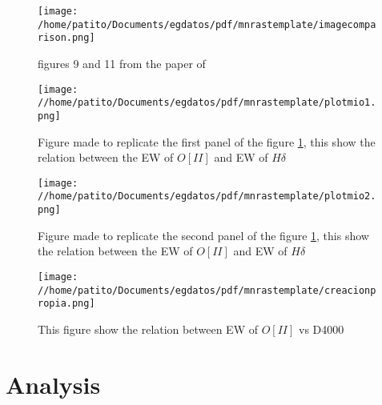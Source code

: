 \documentclass[fleqn,usenatbib]{mnras}
\begin{document}
\begin{figure}
	\texttt{[image: /home/patito/Documents/egdatos/pdf/mnrastemplate/imagecomparison.png]}
    \caption{figures 9 and 11 from the paper of \citet{Balogh}}
    \label{figsbaloghs}
\end{figure}

\begin{figure}
	\texttt{[image: //home/patito/Documents/egdatos/pdf/mnrastemplate/plotmio1.png]}
	\caption{Figure made to replicate the first panel of the figure \ref{figsbaloghs}, this show the relation between the EW of $O[II]$ and EW of $H\delta$}
    \label{plotmio1}
\end{figure}

\begin{figure}
	\texttt{[image: //home/patito/Documents/egdatos/pdf/mnrastemplate/plotmio2.png]}
	\caption{Figure made to replicate the second panel of the figure \ref{figsbaloghs}, this show the relation between the EW of $O[II]$ and EW of $H\delta$}
    \label{plotmio2}
\end{figure}

\begin{figure}
	\texttt{[image: //home/patito/Documents/egdatos/pdf/mnrastemplate/creacionpropia.png]}
	\caption{This figure show the relation between EW of $O[II]$ vs D4000}
    \label{plotcreado}
\end{figure}







\section{Analysis}













\bsp	%
\label{lastpage}
\end{document}
